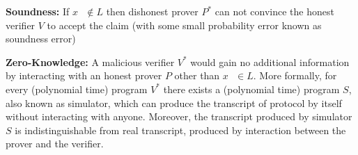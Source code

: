      \textbf{Soundness:} If $x\text{  } \notin L$ then dishonest prover $P^{*}$ can not convince the honest verifier $V$ 
     to accept the claim (with some small probability error known as soundness error)
     
     \textbf{Zero-Knowledge:} A malicious verifier $V^{*}$ would gain no additional information by interacting with an honest prover $P$ 
      other than $x \text{  } \in L$. More formally, for every (polynomial time) program $V^{*}$ there exists a (polynomial time)
      program $S$, also known as simulator, which can produce the transcript of protocol by itself without interacting with anyone. 
      Moreover, the transcript 
      produced by simulator $S$ is indistinguishable from real transcript, produced by interaction between the prover and the verifier. 
      
    
